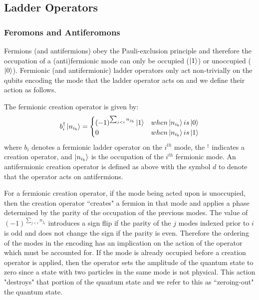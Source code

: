 \subsection{Ladder Operators}
\label{subsec:operators}

\subsubsection{Feromons and Antiferomons}

Fermions (and antifermions) obey the Pauli-exclusion principle  and therefore the occupation of a (anti)fermionic mode can only be occupied ($\ket{1}$) or unoccupied ($\ket{0}$).
Fermionic (and antifermionic) ladder operators only act non-trivially on the qubits encoding the mode that the ladder operator acts on and we define their action as follows.

The fermionic creation operator is given by:
\begin{equation}
    b_i^\dagger \ket{n_{i_b}} = 
    \begin{cases} 
        (-1)^{\sum_{j < i} n_{j_b}} \ket{1}  & when \ket{n_{i_b}} is \ket{0} \\
        0 & when \ket{n_{i_b}} is \ket{1}
    \end{cases}
\end{equation}
where $b_i$ denotes a fermionic ladder operator on the $i^{th}$ mode, the $^\dagger$ indicates a creation operator, and $\ket{n_{i_b}}$ is the occupation of the $i^{th}$ fermionic mode.
An antifermionic creation operator is defined as above with the symbol $d$ to denote that the operator acts on antifermions.

For a fermionic creation operator, if the mode being acted upon is unoccupied, then the creation operator ``creates" a fermion in that mode and applies a phase determined by the parity of the occupation of the previous modes.
The value of $(-1)^{\sum_{j < i} n_{j_b}}$ introduces a sign flip if the parity of the $j$ modes indexed prior to $i$ is odd and does not change the sign if the parity is even. 
Therefore the ordering of the modes in the encoding has an implication on the action of the operator which must be accounted for.
If the mode is already occupied before a creation operator is applied, then the operator sets the amplitude of the quantum state to zero since a state with two particles in the same mode is not physical.
This action "destroys" that portion of the quantum state and we refer to this as ``zeroing-out" the quantum state. 

